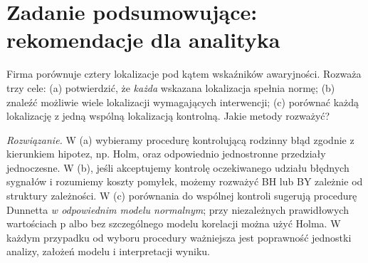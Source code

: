\section{Zadanie podsumowujące: rekomendacje dla analityka}
\begin{zadanie}
Firma porównuje cztery lokalizacje pod kątem wskaźników
awaryjności. Rozważa trzy cele: (a) potwierdzić, że
\emph{każda} wskazana lokalizacja spełnia normę;
(b) znaleźć możliwie wiele lokalizacji wymagających
interwencji; (c) porównać każdą lokalizację z jedną
wspólną lokalizacją kontrolną. Jakie metody rozważyć?
\par\emph{Rozwiązanie.} W (a) wybieramy procedurę
kontrolującą rodzinny błąd zgodnie z kierunkiem hipotez,
np. Holm, oraz odpowiednio jednostronne przedziały
jednoczesne. W (b), jeśli akceptujemy kontrolę
oczekiwanego udziału błędnych sygnałów i rozumiemy
koszty pomyłek, możemy rozważyć BH lub BY zależnie od
struktury zależności. W (c) porównania do wspólnej
kontroli sugerują procedurę Dunnetta \emph{w odpowiednim
modelu normalnym}; przy niezależnych prawidłowych
wartościach p albo bez szczególnego modelu korelacji
można użyć Holma. W każdym przypadku od wyboru
procedury ważniejsza jest poprawność jednostki analizy,
założeń modelu i interpretacji wyniku.
\end{zadanie}



